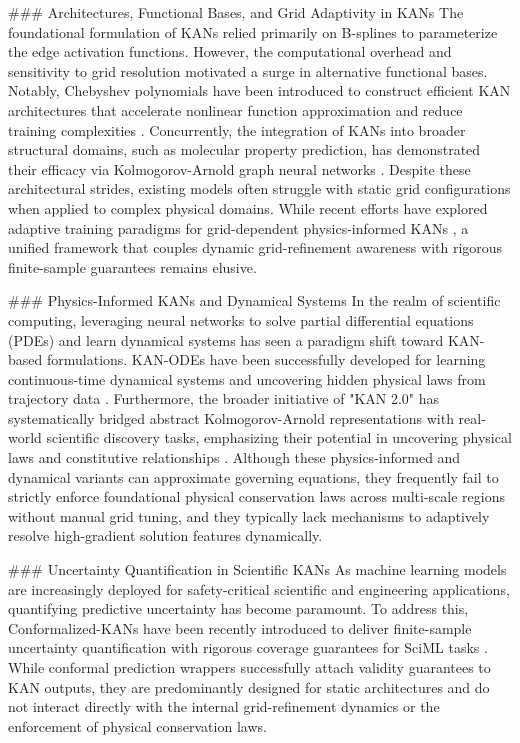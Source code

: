 \documentclass[10pt,twocolumn]{article}
\begin{document}
### Architectures, Functional Bases, and Grid Adaptivity in KANs
The foundational formulation of KANs relied primarily on B-splines to parameterize the edge activation functions. However, the computational overhead and sensitivity to grid resolution motivated a surge in alternative functional bases. Notably, Chebyshev polynomials have been introduced to construct efficient KAN architectures that accelerate nonlinear function approximation and reduce training complexities \cite{ref_5}. Concurrently, the integration of KANs into broader structural domains, such as molecular property prediction, has demonstrated their efficacy via Kolmogorov-Arnold graph neural networks \cite{ref_2}. Despite these architectural strides, existing models often struggle with static grid configurations when applied to complex physical domains. While recent efforts have explored adaptive training paradigms for grid-dependent physics-informed KANs \cite{ref_3}, a unified framework that couples dynamic grid-refinement awareness with rigorous finite-sample guarantees remains elusive.

### Physics-Informed KANs and Dynamical Systems
In the realm of scientific computing, leveraging neural networks to solve partial differential equations (PDEs) and learn dynamical systems has seen a paradigm shift toward KAN-based formulations. KAN-ODEs have been successfully developed for learning continuous-time dynamical systems and uncovering hidden physical laws from trajectory data \cite{ref_4}. Furthermore, the broader initiative of "KAN 2.0" has systematically bridged abstract Kolmogorov-Arnold representations with real-world scientific discovery tasks, emphasizing their potential in uncovering physical laws and constitutive relationships \cite{target_ref}. Although these physics-informed and dynamical variants can approximate governing equations, they frequently fail to strictly enforce foundational physical conservation laws across multi-scale regions without manual grid tuning, and they typically lack mechanisms to adaptively resolve high-gradient solution features dynamically.

### Uncertainty Quantification in Scientific KANs
As machine learning models are increasingly deployed for safety-critical scientific and engineering applications, quantifying predictive uncertainty has become paramount. To address this, Conformalized-KANs have been recently introduced to deliver finite-sample uncertainty quantification with rigorous coverage guarantees for SciML tasks \cite{ref_1}. While conformal prediction wrappers successfully attach validity guarantees to KAN outputs, they are predominantly designed for static architectures and do not interact directly with the internal grid-refinement dynamics or the enforcement of physical conservation laws. 
\end{document}
